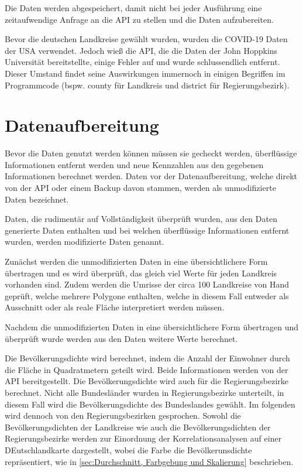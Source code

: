 Die Daten werden abgespeichert, damit nicht bei jeder Ausführung eine zeitaufwendige Anfrage an die API zu stellen und die Daten aufzubereiten.

Bevor die deutschen Landkreise gewählt wurden, wurden die COVID-19 Daten der USA verwendet. Jedoch wieß die API, die die Daten der John Hoppkins Universität bereitstellte, einige Fehler auf und wurde schlussendlich entfernt.
Dieser Umstand findet seine Auswirkungen immernoch in einigen Begriffen im Programmcode (bspw. \glqq{}county\grqq{} für Landkreis und \glqq{}district\grqq{} für Regierungsbezirk).

\section{Datenaufbereitung}
Bevor die Daten genutzt werden können müssen sie gecheckt werden, überflüssige Informationen entfernt werden und neue Kennzahlen aus den gegebenen Informationen berechnet werden. Daten vor der Datenaufbereitung, welche direkt von der API oder einem Backup davon stammen, werden als \glqq{}unmodifizierte\grqq{} Daten bezeichnet. 

Daten, die rudimentär auf Vollständigkeit überprüft wurden, aus den Daten generierte Daten enthalten und bei welchen überflüssige Informationen entfernt wurden, werden \glqq{}modifizierte\grqq{} Daten genannt.

Zunächst werden die unmodifizierten Daten in eine übersichtlichere Form übertragen und es wird überprüft, das gleich viel Werte für jeden Landkreis vorhanden sind. Zudem werden die Umrisse der circa 100 Landkreise von Hand geprüft, welche mehrere Polygone enthalten, welche in diesem Fall entweder als Ausschnitt oder als reale Fläche interpretiert werden müssen.

Nachdem die unmodifizierten Daten in eine übersichtlichere Form übertragen und überprüft wurde werden aus den Daten weitere Werte berechnet.

Die Bevölkerungsdichte wird berechnet, indem die Anzahl der Einwohner durch die Fläche in Quadratmetern geteilt wird. Beide Informationen werden von der API bereitgestellt.
Die Bevölkerungsdichte wird auch für die Regierungsbezirke berechnet. Nicht alle Bundesländer wurden in Regierungsbezirke unterteilt, in diesem Fall wird die Bevölkerungsdichte des Bundeslandes gewählt. Im folgenden wird dennoch von \glqq{}den Regierungsbezirken\grqq{} gesprochen. 
Sowohl die Bevölkerungsdichten der Landkreise wie auch die Bevölkerungsdichten der Regierungsbezirke werden zur Einordnung der Korrelationsanalysen auf einer DEutschlandkarte dargestellt, wobei die Farbe die Bevölkerunsdichte repräsentiert, wie in \autoref{sec:Durchschnitt, Farbgebung und Skalierung} beschrieben.

